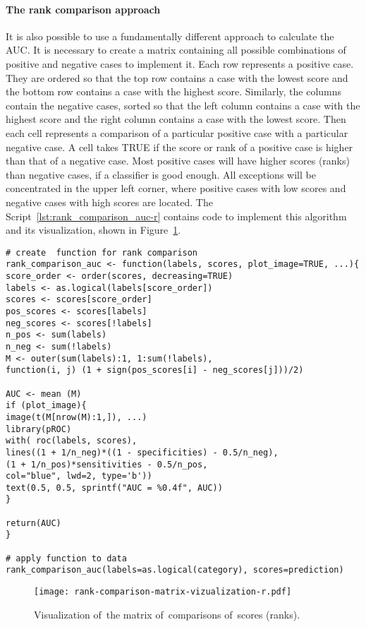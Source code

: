 \documentclass[]{scrreprt}
\begin{document}
\paragraph{The rank comparison approach}
It is also possible to use a fundamentally different approach to calculate the AUC. It is necessary to create a matrix containing all possible combinations of positive and negative cases to implement it. Each row represents a positive case. They are ordered so that the top row contains a case with the lowest score and the bottom row contains a case with the highest score. Similarly, the columns contain the negative cases, sorted so that the left column contains a case with the highest score and the right column contains a case with the lowest score. Then each cell represents a comparison of a particular positive case with a particular negative case. A cell takes TRUE if the score or rank of a positive case is higher than that of a negative case. Most positive cases will have higher scores (ranks) than negative cases, if a classifier is good enough. All exceptions will be concentrated in the upper left corner, where positive cases with low scores and negative cases with high scores are located. The Script~\ref{lst:rank_comparison_auc-r} contains code to implement this algorithm and its visualization, shown in Figure~\ref{fig:rank-comparison-matrix-vizualization-r}.
%
\begin{lstlisting}[float=htp, caption = Create the function to~build a~comparison matrix and apply it to~the test data, firstnumber=1, label= lst:rank_comparison_auc-r]
# create  function for rank comparison
rank_comparison_auc <- function(labels, scores, plot_image=TRUE, ...){
score_order <- order(scores, decreasing=TRUE)
labels <- as.logical(labels[score_order])
scores <- scores[score_order]
pos_scores <- scores[labels]
neg_scores <- scores[!labels]
n_pos <- sum(labels)
n_neg <- sum(!labels)
M <- outer(sum(labels):1, 1:sum(!labels), 
function(i, j) (1 + sign(pos_scores[i] - neg_scores[j]))/2)

AUC <- mean (M)
if (plot_image){
image(t(M[nrow(M):1,]), ...)
library(pROC)
with( roc(labels, scores),
lines((1 + 1/n_neg)*((1 - specificities) - 0.5/n_neg), 
(1 + 1/n_pos)*sensitivities - 0.5/n_pos, 
col="blue", lwd=2, type='b'))
text(0.5, 0.5, sprintf("AUC = %0.4f", AUC))
}

return(AUC)
}

# apply function to data
rank_comparison_auc(labels=as.logical(category), scores=prediction)
\end{lstlisting}
%
\begin{figure}[htp]
	\centering
	\texttt{[image: rank-comparison-matrix-vizualization-r.pdf]}
	\caption{Visualization of~the matrix of~comparisons of~scores (ranks).}
	\label{fig:rank-comparison-matrix-vizualization-r}
\end{figure}
%
\end{document}
